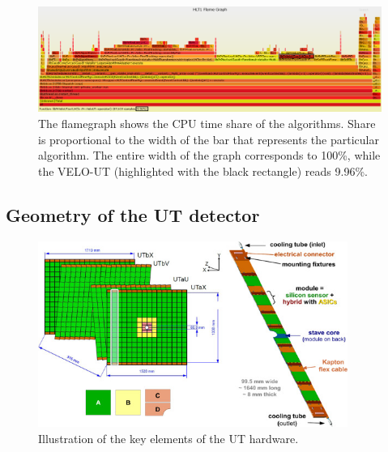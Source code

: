 \documentclass[12pt]{article}
\begin{document}
\begin{figure}[H]
	\begin{center}
		\includegraphics[width=\textwidth]{velout_flamegraph}
	\end{center}
	\caption{The flamegraph shows the CPU time share of the algorithms. Share is proportional to the width of the bar that represents the particular algorithm. The entire width of the graph corresponds to 100\%, while the VELO-UT (highlighted with the black rectangle) reads 9.96\%.}
	\label{fig_velout_flamegraph}
\end{figure}


\subsection{Geometry of the UT detector}

\begin{figure}[H]
	\begin{center}
		\includegraphics[width=0.9\textwidth]{detector_ut_geometry}
	\end{center}
	\caption{Illustration of the key elements of the UT hardware.}
	\label{fig_ut_geometry}
\end{figure}
\end{document}
